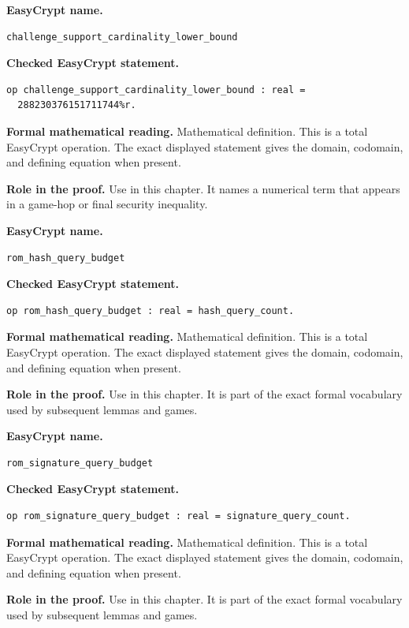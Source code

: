 \begin{formaldefinition}
\noindent\textbf{EasyCrypt name.}
\begin{lstlisting}[language=EasyCrypt,basicstyle=\ttfamily\scriptsize]
challenge_support_cardinality_lower_bound
\end{lstlisting}
\noindent\textbf{Checked EasyCrypt statement.}
\begin{lstlisting}[language=EasyCrypt,basicstyle=\ttfamily\scriptsize]
op challenge_support_cardinality_lower_bound : real =
  288230376151711744%r.
\end{lstlisting}
\noindent\textbf{Formal mathematical reading.}
Mathematical definition. This is a total EasyCrypt operation.  The exact displayed statement gives the domain, codomain, and defining equation when present.

\noindent\textbf{Role in the proof.}
Use in this chapter. It names a numerical term that appears in a game-hop or final security inequality.

\end{formaldefinition}

\begin{formaldefinition}
\noindent\textbf{EasyCrypt name.}
\begin{lstlisting}[language=EasyCrypt,basicstyle=\ttfamily\scriptsize]
rom_hash_query_budget
\end{lstlisting}
\noindent\textbf{Checked EasyCrypt statement.}
\begin{lstlisting}[language=EasyCrypt,basicstyle=\ttfamily\scriptsize]
op rom_hash_query_budget : real = hash_query_count.
\end{lstlisting}
\noindent\textbf{Formal mathematical reading.}
Mathematical definition. This is a total EasyCrypt operation.  The exact displayed statement gives the domain, codomain, and defining equation when present.

\noindent\textbf{Role in the proof.}
Use in this chapter. It is part of the exact formal vocabulary used by subsequent lemmas and games.

\end{formaldefinition}

\begin{formaldefinition}
\noindent\textbf{EasyCrypt name.}
\begin{lstlisting}[language=EasyCrypt,basicstyle=\ttfamily\scriptsize]
rom_signature_query_budget
\end{lstlisting}
\noindent\textbf{Checked EasyCrypt statement.}
\begin{lstlisting}[language=EasyCrypt,basicstyle=\ttfamily\scriptsize]
op rom_signature_query_budget : real = signature_query_count.
\end{lstlisting}
\noindent\textbf{Formal mathematical reading.}
Mathematical definition. This is a total EasyCrypt operation.  The exact displayed statement gives the domain, codomain, and defining equation when present.

\noindent\textbf{Role in the proof.}
Use in this chapter. It is part of the exact formal vocabulary used by subsequent lemmas and games.

\end{formaldefinition}

